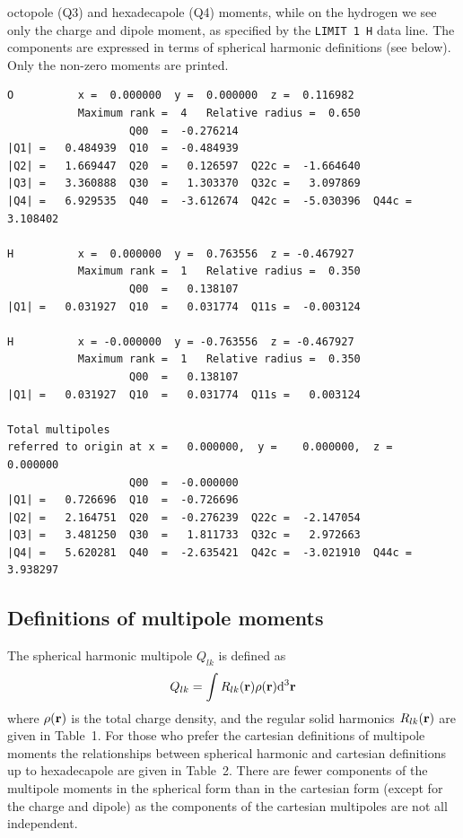 \documentclass[12pt,txfonts]{paper}
\renewcommand{\baselinestretch}{1.05}
\begin{document}
octopole (Q3) and hexadecapole (Q4) moments, while on the hydrogen we
see only the charge and dipole moment, as specified by the
\verb+LIMIT 1 H+ data line. The components are expressed 
in terms of spherical harmonic definitions (see below). Only the
non-zero moments are printed.
\small
\renewcommand{\baselinestretch}{1.0}\small
\begin{verbatim}
O          x =  0.000000  y =  0.000000  z =  0.116982
           Maximum rank =  4   Relative radius =  0.650
                   Q00  =  -0.276214
|Q1| =   0.484939  Q10  =  -0.484939
|Q2| =   1.669447  Q20  =   0.126597  Q22c =  -1.664640
|Q3| =   3.360888  Q30  =   1.303370  Q32c =   3.097869
|Q4| =   6.929535  Q40  =  -3.612674  Q42c =  -5.030396  Q44c =   3.108402

H          x =  0.000000  y =  0.763556  z = -0.467927
           Maximum rank =  1   Relative radius =  0.350
                   Q00  =   0.138107
|Q1| =   0.031927  Q10  =   0.031774  Q11s =  -0.003124

H          x = -0.000000  y = -0.763556  z = -0.467927
           Maximum rank =  1   Relative radius =  0.350
                   Q00  =   0.138107
|Q1| =   0.031927  Q10  =   0.031774  Q11s =   0.003124

Total multipoles
referred to origin at x =   0.000000,  y =    0.000000,  z =    0.000000
                   Q00  =  -0.000000
|Q1| =   0.726696  Q10  =  -0.726696
|Q2| =   2.164751  Q20  =  -0.276239  Q22c =  -2.147054
|Q3| =   3.481250  Q30  =   1.811733  Q32c =   2.972663
|Q4| =   5.620281  Q40  =  -2.635421  Q42c =  -3.021910  Q44c =   3.938297
\end{verbatim}

\clearpage
\normalsize
\subsection{Definitions of multipole moments}
\label{multipoles}

The spherical
harmonic multipole $Q_{lk}$ is defined as
\begin{equation*}
Q_{lk} = \int R_{lk}({\bf r}) \rho({\bf r}) {\rm d}^3{\bf r}
\end{equation*}
where $\rho({\bf r})$ is the total charge density, and the regular
solid harmonics $R_{lk}({\bf r})$ are given in Table~1. For those who
prefer the cartesian definitions of multipole moments the relationships
between spherical harmonic and cartesian definitions up to
hexadecapole are given in Table~2.
There are fewer components of the multipole moments in the spherical form
than in the cartesian form (except for the charge and dipole) as the
components of the cartesian multipoles are not all independent.
\end{document}
